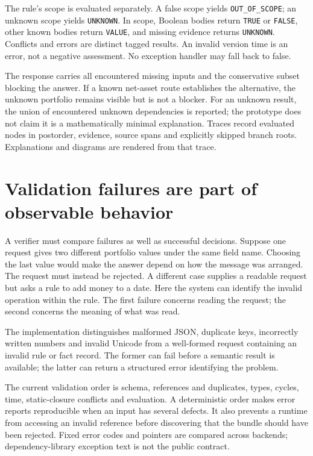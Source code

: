 \documentclass[12pt,a4paper,oneside,openany]{book}
\begin{document}
The rule's scope is evaluated separately. A false scope yields
\texttt{OUT\_OF\_SCOPE}; an unknown scope yields \texttt{UNKNOWN}. In scope,
Boolean bodies return \texttt{TRUE} or \texttt{FALSE}, other known bodies return
\texttt{VALUE}, and missing evidence returns \texttt{UNKNOWN}. Conflicts and
errors are distinct tagged results. An invalid version time is an error, not a
negative assessment. No exception handler may fall back to false.

The response carries all encountered missing inputs and the conservative subset
blocking the answer. If a known net-asset route establishes the alternative,
the unknown portfolio remains visible but is not a blocker. For an unknown
result, the union of encountered unknown dependencies is reported; the prototype
does not claim it is a mathematically minimal explanation. Traces record evaluated
nodes in postorder, evidence, source spans and explicitly skipped branch roots.
Explanations and diagrams are rendered from that trace.

\section{Validation failures are part of observable behavior}
\label{merge:M07:04}


A verifier must compare failures as well as successful decisions. Suppose one
request gives two different portfolio values under the same field name. Choosing
the last value would make the answer depend on how the message was arranged.
The request must instead be rejected. A different case supplies a readable
request but asks a rule to add money to a date. Here the system can identify the
invalid operation within the rule. The first failure concerns reading the
request; the second concerns the meaning of what was read.

The implementation distinguishes malformed JSON, duplicate keys, incorrectly
written numbers and invalid Unicode from a well-formed request containing an
invalid rule or fact record. The former can fail before a semantic result is
available; the latter can return a structured error identifying the problem.

The current validation order is schema, references and duplicates, types, cycles,
time, static-closure conflicts and evaluation. A deterministic order makes error
reports reproducible when an input has several defects. It also prevents a
runtime from accessing an invalid reference before discovering that the bundle
should have been rejected. Fixed error codes and pointers are compared across
backends; dependency-library exception text is not the public contract.
\end{document}
